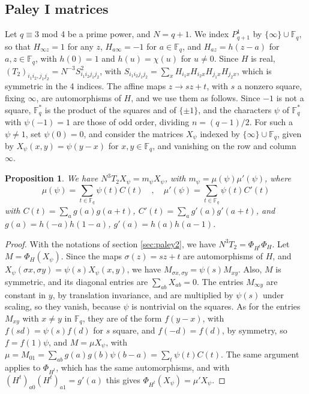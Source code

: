 \documentclass[11pt]{amsart}
\newtheorem{proposition}[theorem]{Proposition}
\begin{document}
\subsection{Paley I matrices}\label{sec:paley1}


\medskip

Let $q\equiv3$ mod 4 be a prime power, and $N=q+1$. We index $P^1_{q+1}$ by $\{\infty\}\cup\mathbb F_q$, so that $H_{\infty z}=1$ for any $z$, $H_{a\infty}=-1$ for $a\in\mathbb F_q$, and $H_{az}=h(z-a)$ for $a,z\in\mathbb F_q$, with $h(0)=1$ and $h(u)=\chi(u)$ for $u\neq0$. Since $H$ is real, $(T_2)_{i_1i_2,j_1j_2}=N^{-3}S_{i_1i_2j_1j_2}^2$, with $S_{i_1i_2j_1j_2}=\sum_xH_{i_1x}H_{i_2x}H_{j_1x}H_{j_2x}$, which is symmetric in the 4 indices. The affine maps $z\to sz+t$, with $s$ a nonzero square, fixing $\infty$, are automorphisms of $H$, and we use them as follows. Since $-1$ is not a square, $\mathbb F_q^*$ is the product of the squares and of $\{\pm1\}$, and the characters $\psi$ of $\mathbb F_q^*$ with $\psi(-1)=1$ are those of odd order, dividing $n=(q-1)/2$. For such a $\psi\neq1$, set $\psi(0)=0$, and consider the matrices $X_\psi$ indexed by $\{\infty\}\cup\mathbb F_q$, given by $X_\psi(x,y)=\psi(y-x)$ for $x,y\in\mathbb F_q$, and vanishing on the row and column $\infty$.

\begin{proposition}\label{prop:principal}
We have $N^3T_2X_\psi=m_\psi X_\psi$, with $m_\psi=\mu(\psi)\mu'(\psi)$, where
$$\mu(\psi)=\sum_{t\in\mathbb F_q}\psi(t)C(t)\quad,\quad\mu'(\psi)=\sum_{t\in\mathbb F_q}\psi(t)C'(t)$$
with $C(t)=\sum_ag(a)g(a+t)$, $C'(t)=\sum_ag'(a)g'(a+t)$, and $g(a)=h(-a)h(1-a)$, $g'(a)=h(a)h(a-1)$.
\end{proposition}

\begin{proof}
With the notations of section \ref{sec:paley2}, we have $N^3T_2=\Phi_{H^t}\Phi_H$. Let $M=\Phi_H(X_\psi)$. Since the maps $\sigma(z)=sz+t$ are automorphisms of $H$, and $X_\psi(\sigma x,\sigma y)=\psi(s)X_\psi(x,y)$, we have $M_{\sigma x,\sigma y}=\psi(s)M_{xy}$. Also, $M$ is symmetric, and its diagonal entries are $\sum_{ab}X_{ab}=0$. The entries $M_{\infty y}$ are constant in $y$, by translation invariance, and are multiplied by $\psi(s)$ under scaling, so they vanish, because $\psi$ is nontrivial on the squares. As for the entries $M_{xy}$ with $x\neq y$ in $\mathbb F_q$, they are of the form $f(y-x)$, with $f(sd)=\psi(s)f(d)$ for $s$ square, and $f(-d)=f(d)$, by symmetry, so $f=f(1)\psi$, and $M=\mu X_\psi$, with $\mu=M_{01}=\sum_{ab}g(a)g(b)\psi(b-a)=\sum_t\psi(t)C(t)$. The same argument applies to $\Phi_{H^t}$, which has the same automorphisms, and with $(H^t)_{a0}(H^t)_{a1}=g'(a)$ this gives $\Phi_{H^t}(X_\psi)=\mu'X_\psi$.
\end{proof}
\end{document}
